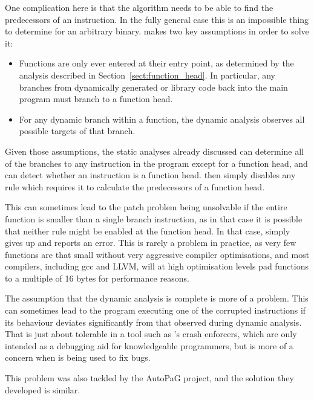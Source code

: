 One complication here is that the algorithm needs to be able to find
the predecessors of an instruction.  In the fully general case this is
an impossible thing to determine for an arbitrary binary.
{\Technique} makes two key assumptions in order to solve it:

\begin{itemize}
\item
  Functions are only ever entered at their entry point, as determined
  by the analysis described in Section~\ref{sect:function_head}.  In
  particular, any branches from dynamically generated or library code
  back into the main program must branch to a function head.
\item
  For any dynamic branch within a function, the dynamic analysis
  observes all possible targets of that branch.
\end{itemize}

Given those assumptions, the static analyses already discussed can
determine all of the branches to any instruction in the program except
for a function head, and can detect whether an instruction is a
function head.  {\Technique} then simply disables any rule which
requires it to calculate the predecessors of a function head.

This can sometimes lead to the patch problem being unsolvable if the
entire function is smaller than a single branch instruction, as in
that case it is possible that neither rule might be enabled at the
function head.  In that case, {\implementation} simply gives up and
reports an error.  This is rarely a problem in practice, as very few
functions are that small without very aggressive compiler
optimisations, and most compilers, including gcc and LLVM\needCite{},
will at high optimisation levels pad functions to a multiple of 16
bytes for performance reasons.

The assumption that the dynamic analysis is complete is more of a
problem.  This can sometimes lead to the program executing one of the
corrupted instructions if its behaviour deviates significantly from
that observed during dynamic analysis.  That is just about tolerable
in a tool such as {\technique}'s crash enforcers, which are only
intended as a debugging aid for knowledgeable programmers, but is more
of a concern when {\technique} is being used to fix bugs. 

This problem was also tackled by the AutoPaG project, and the solution
they developed is similar. 

